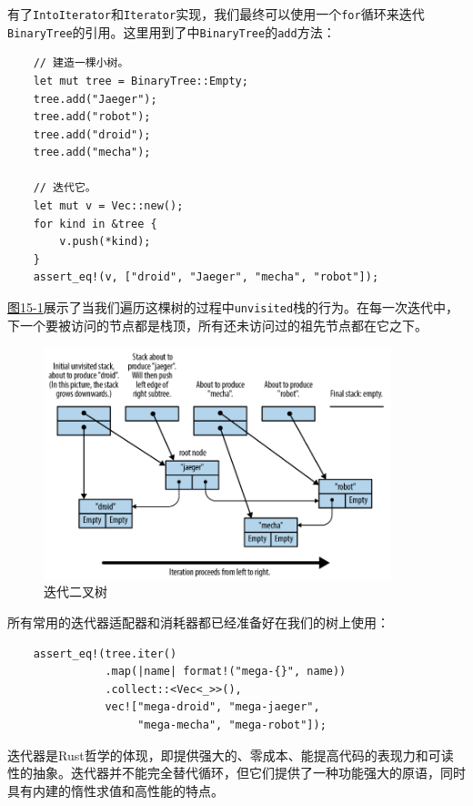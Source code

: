 有了\texttt{IntoIterator}和\texttt{Iterator}实现，我们最终可以使用一个\texttt{for}循环来迭代\texttt{BinaryTree}的引用。这里用到了中\texttt{BinaryTree}的\texttt{add}方法：
\begin{verbatim}
    // 建造一棵小树。
    let mut tree = BinaryTree::Empty;
    tree.add("Jaeger");
    tree.add("robot");
    tree.add("droid");
    tree.add("mecha");

    // 迭代它。
    let mut v = Vec::new();
    for kind in &tree {
        v.push(*kind);
    }
    assert_eq!(v, ["droid", "Jaeger", "mecha", "robot"]);
\end{verbatim}

\hyperref[f15-1]{图15-1}展示了当我们遍历这棵树的过程中\texttt{unvisited}栈的行为。在每一次迭代中，下一个要被访问的节点都是栈顶，所有还未访问过的祖先节点都在它之下。

\begin{figure}[htbp]
    \centering
    \includegraphics[width=0.9\textwidth]{../img/f15-1.png}
    \caption{迭代二叉树}
    \label{f15-1}
\end{figure}

所有常用的迭代器适配器和消耗器都已经准备好在我们的树上使用：
\begin{verbatim}
    assert_eq!(tree.iter()
               .map(|name| format!("mega-{}", name))
               .collect::<Vec<_>>(),
               vec!["mega-droid", "mega-jaeger",
                    "mega-mecha", "mega-robot"]);
\end{verbatim}

迭代器是Rust哲学的体现，即提供强大的、零成本、能提高代码的表现力和可读性的抽象。迭代器并不能完全替代循环，但它们提供了一种功能强大的原语，同时具有内建的惰性求值和高性能的特点。
